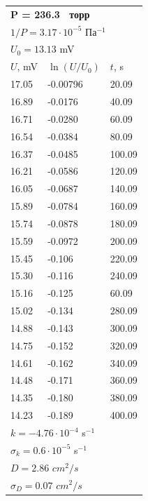 \documentclass[a4paper,12pt]{article}
\begin{document}
\begin{center}
\begin{tabular}{||l|l|l||}
			
			\multicolumn{3}{||l||}{\textbf{P = 236.3  торр}} \\ 
			\multicolumn{3}{||l||}{$1 / P = 3.17\cdot 10^{-5}$ $Па^{-1}$} \\ \hline
			\multicolumn{3}{||l||}{$U_0 = 13.13$ mV} \\ \hline
			$U$, mV&$\ln (U/U_0)$ & $t$, s \\ \hline
			17.05 & -0.00796  &20.09 \\ \hline
			16.89 &  -0.0176&40.09 \\ \hline
			16.71 & -0.0280&60.09  \\ \hline
			16.54 & -0.0384 &80.09  \\ \hline
			16.37 & -0.0485 &100.09  \\ \hline
			16.21  & -0.0586 &120.09  \\ \hline
			16.05& 	-0.0687&140.09  \\ \hline
			15.89& -0.0784&160.09  \\ \hline
			15.74& -0.0878 &180.09  \\ \hline
			15.59& -0.0972&200.09  \\ \hline
			15.45& -0.106&220.09  \\ \hline
			15.30& -0.116 &240.09  \\ \hline
			15.16& -0.125 &60.09  \\ \hline
			15.02& -0.134 &280.09  \\ \hline
			14.88& -0.143  &300.09  \\ \hline
			14.75&-0.152& 320.09  \\ \hline
			14.61& -0.162&340.09  \\ \hline
			14.48&-0.171& 360.09  \\ \hline
			14.35& 	-0.180 &380.09  \\ \hline
			14.23& -0.189&400.09  \\ \hline
			\multicolumn{3}{||l||}{$k = -4.76 \cdot 10^{-4}$ s$^{-1}$} \\ 
			\multicolumn{3}{||l||}{$\sigma_k =0.6\cdot 10^{-5}$ s$^{-1}$} \\ \hline 
			\multicolumn{3}{||l||}{$D = 2.86$ $cm^2/s$}\\ 
			\multicolumn{3}{||l||}{$\sigma_D =0.07$ $cm^2/s$} \\ \hline 
		\end{tabular}
		
		
		
		
	\end{center}

\newpage
\end{document}
